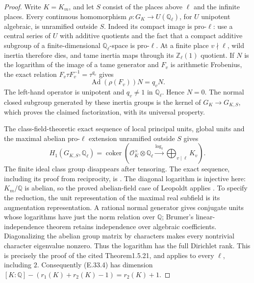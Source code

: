 \begin{proof}
Write $K=K_m$, and let $S$ consist of the places above $\ell$ and
the infinite places. Every continuous homomorphism
$\rho:G_K\to U(\mathbb Q_\ell)$, for $U$ unipotent algebraic,
is unramified outside $S$. Indeed its compact image is pro-$\ell$:
use a central series of $U$ with additive quotients and the fact
that a compact additive subgroup of a finite-dimensional
$\mathbb Q_\ell$-space is pro-$\ell$. At a finite place $v\nmid\ell$,
wild inertia therefore dies, and tame inertia maps through its
$\mathbb Z_\ell(1)$ quotient. If $N$ is the logarithm of the image
of a tame generator and $F_v$ is arithmetic Frobenius, the exact
relation $F_v\tau F_v^{-1}=\tau^{q_v}$ gives
\[
 \operatorname{Ad}(\rho(F_v))N=q_v N.
\]
The left-hand operator is unipotent and $q_v\ne1$ in
$\mathbb Q_\ell$. Hence $N=0$. The normal closed subgroup generated
by these inertia groups is the kernel of $G_K\to G_{K,S}$,
which proves the claimed factorization, with its universal property.

The class-field-theoretic exact sequence of local principal units,
global units and the maximal abelian pro-$\ell$ extension unramified
outside $S$ gives
\[
 H_1(G_{K,S},\mathbb Q_\ell)
 =\operatorname{coker}\left(
 \mathcal O_K^{\times}\otimes\mathbb Q_\ell
 \xrightarrow{\log_\ell}
 \bigoplus_{v\mid\ell}K_v\right).                       \tag{E.33.4}
\]
The finite ideal class group disappears after tensoring. The exact
sequence, including its proof from reciprocity, is
\cite[Theorem1.5.4 and Theorem1.5.7]{E_SharifiIwasawa}.
The diagonal logarithm is injective here: $K_m/\mathbb Q$ is
abelian, so the proved abelian-field case of Leopoldt applies
\cite[Theorems1.5.17 and1.5.21]{E_SharifiIwasawa}.
To specify the reduction, the unit representation of the maximal
real subfield is its augmentation representation. A rational
normal generator gives conjugate units whose logarithms have just
the norm relation over $\mathbb Q$; Brumer's linear-independence
theorem retains independence over algebraic coefficients.
Diagonalizing the abelian group matrix by characters makes every
nontrivial character eigenvalue nonzero. Thus the logarithm has
the full Dirichlet rank. This is precisely the proof of the cited
Theorem1.5.21, and applies to every $\ell$, including $2$.
Consequently (E.33.4) has dimension
$[K:\mathbb Q]-(r_1(K)+r_2(K)-1)=r_2(K)+1$.


\end{proof}
